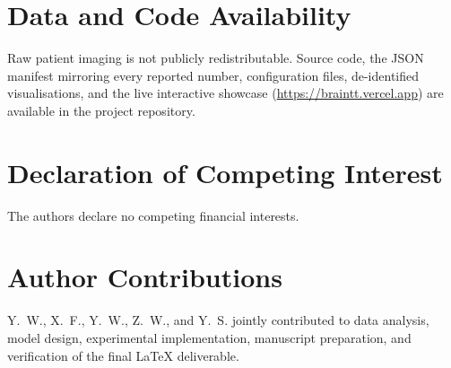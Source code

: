 \documentclass[11pt,a4paper]{article}
\begin{document}
\section*{Data and Code Availability}

Raw patient imaging is not publicly redistributable. Source code, the JSON manifest mirroring every reported number, configuration files, de-identified visualisations, and the live interactive showcase (\url{https://braintt.vercel.app}) are available in the project repository.

\section*{Declaration of Competing Interest}

The authors declare no competing financial interests.

\section*{Author Contributions}

Y.~W., X.~F., Y.~W., Z.~W., and Y.~S. jointly contributed to data analysis, model design, experimental implementation, manuscript preparation, and verification of the final LaTeX deliverable.
\end{document}
